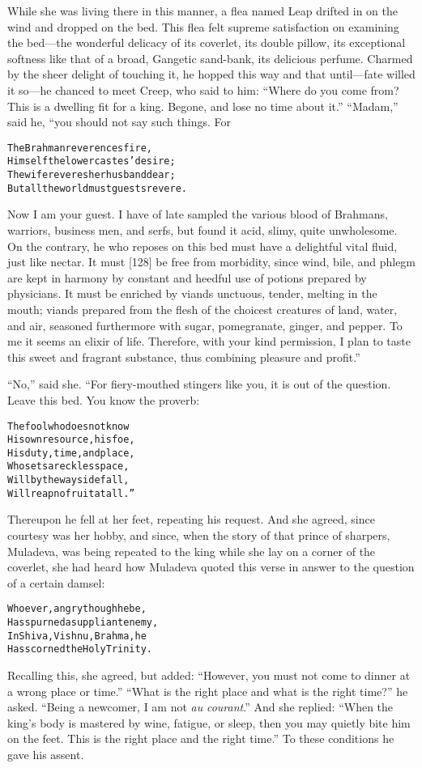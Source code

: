 \documentclass{article}
\renewenvironment{verbatim}{\begin{alltt}\normalfont\begin{centering}}{\end{centering}\end{alltt}}
\begin{document}
While she was living there in this manner, a flea named Leap
drifted in on the wind and dropped on the bed. This flea felt
supreme satisfaction on examining the bed---the wonderful delicacy
of its coverlet, its double pillow, its exceptional softness like
that of a broad, Gangetic sand-bank, its delicious perfume. Charmed
by the sheer delight of touching it, he hopped this way and that
until---fate willed it so---he chanced to meet Creep, who said to
him:
``Where do you come from? This is a dwelling fit for a king. Begone, and lose no time about it.''
``Madam,'' said he, “you should not say such things. For

\begin{verbatim}
The Brahman reverences fire,
Himself the lower castes' desire;
The wife reveres her husband dear;
But all the world must guests revere.
\end{verbatim}
Now I am your guest. I have of late sampled the various blood of
Brahmans, warriors, business men, and serfs, but found it acid,
slimy, quite unwholesome. On the contrary, he who reposes on this
bed must have a delightful vital fluid, just like nectar. It must
[128] be free from morbidity, since wind, bile, and phlegm are kept
in harmony by constant and heedful use of potions prepared by
physicians. It must be enriched by viands unctuous, tender, melting
in the mouth; viands prepared from the flesh of the choicest
creatures of land, water, and air, seasoned furthermore with sugar,
pomegranate, ginger, and pepper. To me it seems an elixir of life.
Therefore, with your kind permission, I plan to taste this sweet
and fragrant substance, thus combining pleasure and profit.”

``No,'' said she. “For fiery-mouthed stingers like you, it is out
of the question. Leave this bed. You know the proverb:

\begin{verbatim}
The fool who does not know
His own resource, his foe,
His duty, time, and place,
Who sets a reckless pace,
Will by the wayside fall,
Will reap no fruit at all.”
\end{verbatim}
Thereupon he fell at her feet, repeating his request. And she
agreed, since courtesy was her hobby, and since, when the story of
that prince of sharpers, Muladeva, was being repeated to the king
while she lay on a corner of the coverlet, she had heard how
Muladeva quoted this verse in answer to the question of a certain
damsel:

\begin{verbatim}
Whoever, angry though he be,
Has spurned a suppliant enemy,
In Shiva, Vishnu, Brahma, he
Has scorned the Holy Trinity.
\end{verbatim}
Recalling this, she agreed, but added:
``However, you must not come to dinner at a wrong place or time.''
``What is the right place and what is the right time?'' he asked.
``Being a newcomer, I am not \emph{au} \emph{courant}.'' And she
replied:
``When the king's body is mastered by wine, fatigue, or sleep, then you may quietly bite him on the feet. This is the right place and the right time.''
To these conditions he gave his assent.
\end{document}
